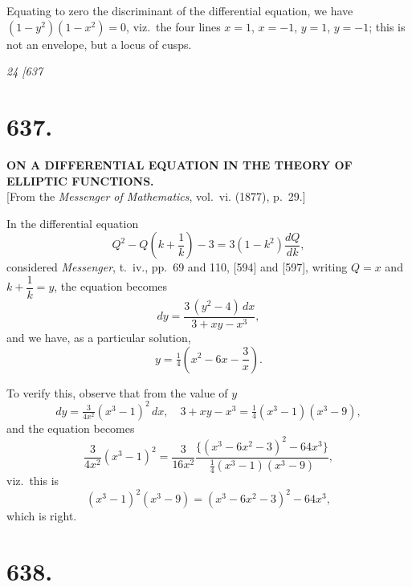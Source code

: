 \documentclass[12pt,a4paper]{article}
\begin{document}
Equating to zero the discriminant of the differential equation, we have $(1 - y^2)(1 - x^2) = 0$, viz.\ the four lines $x = 1$, $x = -1$, $y = 1$, $y = -1$; this is not an envelope, but a locus of cusps.

\clearpage
\setcounter{page}{24}

\begin{center}
\textit{24 \hfill \hfill [637}
\end{center}

\section*{637.}

\begin{center}
\textbf{ON A DIFFERENTIAL EQUATION IN THE THEORY OF ELLIPTIC FUNCTIONS.}\\[1em]
[From the \textit{Messenger of Mathematics}, vol.~vi. (1877), p.~29.]
\end{center}

In the differential equation
\[
Q^2 - Q\!\left(k + \frac{1}{k}\right) - 3 = 3(1 - k^2)\frac{dQ}{dk},
\]
considered \textit{Messenger}, t.~iv., pp.~69 and 110, [594] and [597], writing $Q = x$ and $k + \dfrac{1}{k} = y$, the equation becomes
\[
dy = \frac{3\, (y^2 - 4)\, dx}{3 + x y - x^3},
\]
and we have, as a particular solution,
\[
y = \tfrac{1}{4}\!\left(x^2 - 6 x - \frac{3}{x}\right).
\]

To verify this, observe that from the value of $y$
\[
d y = \tfrac{3}{4 x^2}(x^3 - 1)^2\, d x, \quad 3 + x y - x^3 = \tfrac{1}{4}(x^3 - 1)(x^3 - 9),
\]
and the equation becomes
\[
\frac{3}{4 x^2}(x^3 - 1)^2 = \frac{3}{16 x^2}\frac{\{(x^3 - 6 x^2 - 3)^2 - 64 x^3\}}{\tfrac{1}{4}(x^3 - 1)(x^3 - 9)},
\]
viz.\ this is
\[
(x^3 - 1)^2 (x^3 - 9) = (x^3 - 6 x^2 - 3)^2 - 64 x^3,
\]
which is right.

\clearpage
\setcounter{page}{25}

\section*{638.}
\end{document}

